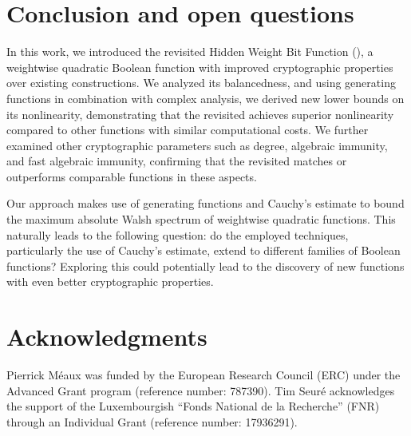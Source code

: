 \documentclass[11pt]{llncs}
\begin{document}
\section{Conclusion and open questions}

In this work, we introduced the revisited Hidden Weight Bit Function (\hwbf{}), a weightwise quadratic Boolean function with improved cryptographic properties over existing constructions. We analyzed its balancedness, and using generating functions in combination with complex analysis, we derived new lower bounds on its nonlinearity, demonstrating that the revisited \hwbf{} achieves superior nonlinearity compared to other functions with similar computational costs. We further examined other cryptographic parameters such as degree, algebraic immunity, and fast algebraic immunity, confirming that the revisited \hwbf{} matches or outperforms comparable functions in these aspects.

Our approach makes use of generating functions and Cauchy’s estimate to bound the maximum absolute Walsh spectrum of weightwise quadratic functions. This naturally leads to the following question: do the employed techniques, particularly the use of Cauchy’s estimate, extend to different families of Boolean functions? Exploring this could potentially lead to the discovery of new functions with even better cryptographic properties.

\ifnum{}
\section{Acknowledgments}
Pierrick Méaux was funded by the European Research Council (\textsf{ERC}) under the Advanced Grant program (reference number: 787390). Tim Seuré acknowledges the support of the Luxembourgish “Fonds National de la Recherche” (\textsf{FNR}) through an Individual Grant (reference number: 17936291).
\fi


\newpage



\ifnum{}


\else


\fi
\end{document}
